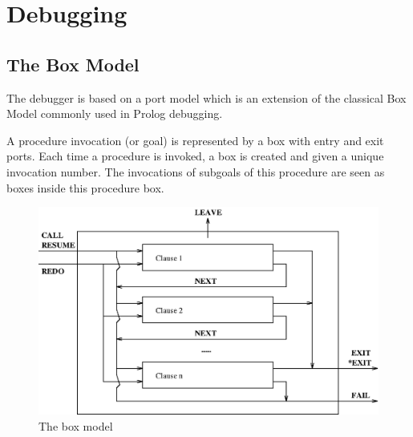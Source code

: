 %
% 
% 
% 
% 
%
%

\chapter{Debugging}
\label{chapdebug}

\section{The Box Model}
\label{boxmodel}

The {\eclipse} debugger is based on a port model which is an extension
of the classical Box Model commonly used in Prolog debugging.

A procedure invocation (or goal) is represented by a box with entry
and exit ports.  Each time a procedure is invoked, a box is created
and given a unique invocation number.  The invocations of subgoals of
this procedure are seen as boxes inside this procedure box.

\begin{figure}
\begin{center}
\includegraphics{boxmodel.eps}
\end{center}
\caption{The box model}
\end{figure}

